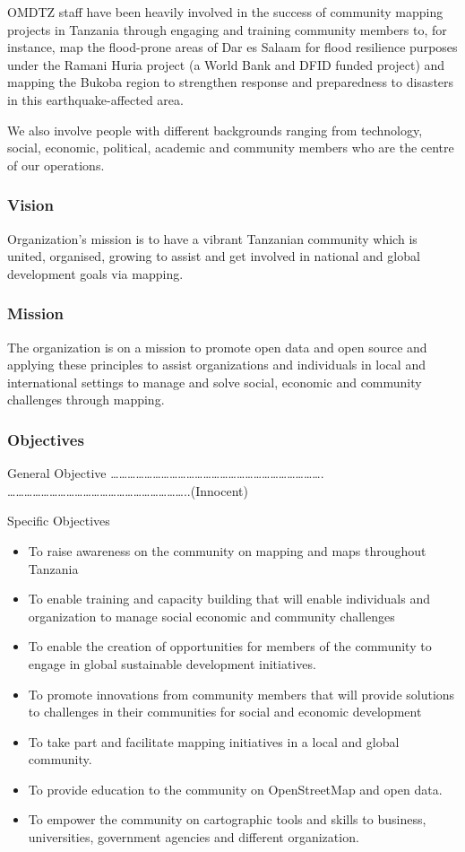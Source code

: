 \documentclass[a4paper,12pt,twoside]{article}
\begin{document}
OMDTZ staff have been heavily involved in the success of community mapping projects in Tanzania through engaging and training community members to, for instance, map the flood-prone areas of Dar es Salaam for flood resilience purposes under the Ramani Huria project (a World Bank and DFID funded project) and mapping the Bukoba region to strengthen response and preparedness to disasters in this earthquake-affected area. 

We also involve people with different backgrounds ranging from technology, social, economic, political, academic and community members who are the centre of our operations.



\subsubsection {Vision}
Organization’s mission is to have a vibrant Tanzanian community which is united, organised, growing to assist and get involved in national and global development goals via mapping.


\subsubsection{Mission}
The organization is on a mission to promote open data and open source and applying these principles to assist organizations and individuals in local and international settings to manage and solve social, economic and community challenges through mapping.

\subsubsection{Objectives}

General Objective
………………………………………………………………….
………………………………………………………..(Innocent)


Specific Objectives
\begin{itemize}

\item To raise awareness on the community on mapping and maps throughout Tanzania
\item To enable training and capacity building that will enable individuals and organization to manage social economic and community challenges
\item To enable the creation of opportunities for members of the community to engage in global sustainable development initiatives.
\item To promote innovations from community members that will provide solutions to challenges in their communities for social and economic development
\item To take part and facilitate mapping initiatives in a local and global community.
\item To provide education to the community on OpenStreetMap and open data.
\item To empower the community on cartographic tools and skills to business, universities, government agencies and different organization.
\end{itemize}
\end{document}
